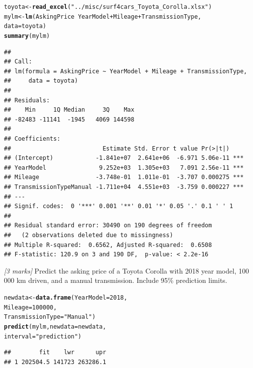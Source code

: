 \documentclass{article}\usepackage[]{graphicx}\usepackage[]{xcolor}
\makeatletter
\newcommand{\hlnum}[1]{\textcolor[rgb]{0.686,0.059,0.569}{#1}}%
\newcommand{\hlsng}[1]{\textcolor[rgb]{0.192,0.494,0.8}{#1}}%
\newcommand{\hlopt}[1]{\textcolor[rgb]{0,0,0}{#1}}%
\newcommand{\hldef}[1]{\textcolor[rgb]{0.345,0.345,0.345}{#1}}%
\newcommand{\hlkwb}[1]{\textcolor[rgb]{0.69,0.353,0.396}{#1}}%
\newcommand{\hlkwc}[1]{\textcolor[rgb]{0.333,0.667,0.333}{#1}}%
\newcommand{\hlkwd}[1]{\textcolor[rgb]{0.737,0.353,0.396}{\textbf{#1}}}%
\newenvironment{kframe}{%
 \def\at@end@of@kframe{}%
 \ifinner\ifhmode%
  \def\at@end@of@kframe{\end{minipage}}%
  \begin{minipage}{\columnwidth}%
 \fi\fi%
 \def\FrameCommand##1{\hskip\@totalleftmargin \hskip-\fboxsep
 \colorbox{shadecolor}{##1}\hskip-\fboxsep
     \hskip-\linewidth \hskip-\@totalleftmargin \hskip\columnwidth}%
 \MakeFramed {\advance\hsize-\width
   \@totalleftmargin\z@ \linewidth\hsize
   \@setminipage}}%
 {\par\unskip\endMakeFramed%
 \at@end@of@kframe}
\newenvironment{knitrout}{}{} %
\newif\ifmemo
\makeatother
\begin{document}
\begin{knitrout}
\color{fgcolor}\begin{kframe}
\begin{alltt}
\hldef{toyota} \hlkwb{<-} \hlkwd{read_excel}\hldef{(}\hlsng{"../misc/surf4cars_Toyota_Corolla.xlsx"}\hldef{)}
\hldef{mylm} \hlkwb{<-} \hlkwd{lm}\hldef{(AskingPrice} \hlopt{~} \hldef{YearModel} \hlopt{+} \hldef{Mileage} \hlopt{+} \hldef{TransmissionType,}
           \hlkwc{data} \hldef{= toyota)}
\hlkwd{summary}\hldef{(mylm)}
\end{alltt}
\begin{verbatim}
## 
## Call:
## lm(formula = AskingPrice ~ YearModel + Mileage + TransmissionType, 
##     data = toyota)
## 
## Residuals:
##    Min     1Q Median     3Q    Max 
## -82483 -11141  -1945   4069 144598 
## 
## Coefficients:
##                          Estimate Std. Error t value Pr(>|t|)    
## (Intercept)            -1.841e+07  2.641e+06  -6.971 5.06e-11 ***
## YearModel               9.252e+03  1.305e+03   7.091 2.56e-11 ***
## Mileage                -3.748e-01  1.011e-01  -3.707 0.000275 ***
## TransmissionTypeManual -1.711e+04  4.551e+03  -3.759 0.000227 ***
## ---
## Signif. codes:  0 '***' 0.001 '**' 0.01 '*' 0.05 '.' 0.1 ' ' 1
## 
## Residual standard error: 30490 on 190 degrees of freedom
##   (2 observations deleted due to missingness)
## Multiple R-squared:  0.6562,	Adjusted R-squared:  0.6508 
## F-statistic: 120.9 on 3 and 190 DF,  p-value: < 2.2e-16
\end{verbatim}
\end{kframe}
\end{knitrout}

\ifmemo
\textcolor{red}{\tick for importing data; \tick for calling \texttt{lm}; \tick for formula and data arguments; \tick for \texttt{summary}}
\fi

  \item \textit{[3 marks]} Predict the asking price of a Toyota Corolla with 2018 year model, 100 000 km driven, and a manual transmission. Include 95\% prediction limits.
 
\begin{knitrout}
\color{fgcolor}\begin{kframe}
\begin{alltt}
\hldef{newdata} \hlkwb{<-} \hlkwd{data.frame}\hldef{(}\hlkwc{YearModel} \hldef{=} \hlnum{2018}\hldef{,}
                      \hlkwc{Mileage} \hldef{=} \hlnum{100000}\hldef{,}
                      \hlkwc{TransmissionType} \hldef{=} \hlsng{"Manual"}\hldef{)}
\hlkwd{predict}\hldef{(mylm,} \hlkwc{newdata} \hldef{= newdata,}
        \hlkwc{interval} \hldef{=} \hlsng{"prediction"}\hldef{)}
\end{alltt}
\begin{verbatim}
##        fit    lwr      upr
## 1 202504.5 141723 263286.1
\end{verbatim}
\end{kframe}
\end{knitrout}
\ifmemo
\textcolor{red}{\tick for creating new data frame; \tick for calling \texttt{predict}; \tick for \texttt{interval = "prediction"}}
\fi


\eeq


\eeq
\end{document}
